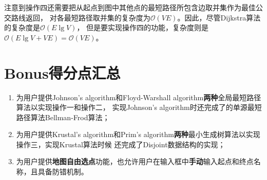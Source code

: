 \documentclass{article}
\begin{document}
注意到操作四还需要把从起点到图中其他点的最短路径所包含边取并集作为最佳公交路线返回，
对各最短路径取并集的复杂度为$\mathcal{O}(VE)$。因此，尽管Dijkstra算法的复杂度是$\mathcal{O}(E\lg V)$，
但是要实现操作四的功能，复杂度则是$\mathcal{O}(E\lg V + VE) = \mathcal{O}(VE)$。

\section{Bonus得分点汇总}
\begin{enumerate}

	\item 为用户提供Johnson's algorithm和Floyd-Warshall algorithm\textbf{两种}全局最短路径算法以实现操作一和操作二，
		实现Johnson's algorithm时还完成了的单源最短路径算法Bellman-Frod算法；
	\item 为用户提供Krustal's algorithm和Prim's algorithm\textbf{两种}最小生成树算法以实现操作三，实现Krustal算法时候
		还完成了Disjoint数据结构的实现；
	\item 为用户提供\textbf{地图自由选点}功能，也允许用户在输入框中\textbf{手动}输入起点和终点名称，且具备防错机制。
	
\end{enumerate}
\end{document}
